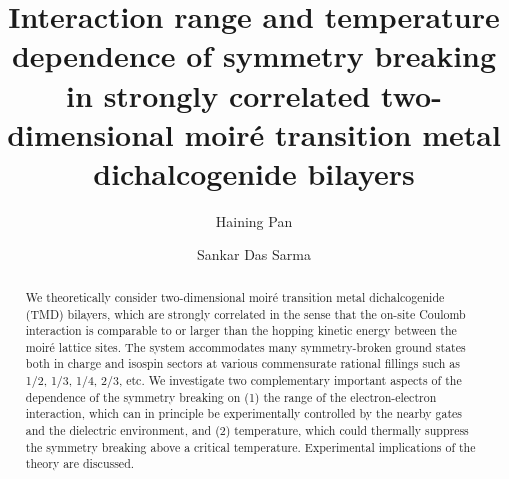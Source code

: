 \documentclass[aps,prb,twocolumn,superscriptaddress,longbibliography]{revtex4-2}
\begin{document}
\title{Interaction range and temperature dependence of symmetry breaking in strongly correlated two-dimensional moir\'e transition metal dichalcogenide bilayers}
\author{Haining Pan}
\author{Sankar Das Sarma}

\begin{abstract}
    We theoretically consider two-dimensional moir\'e transition metal dichalcogenide (TMD) bilayers, which are strongly correlated in the sense that the on-site Coulomb interaction is comparable to or larger than the hopping kinetic energy between the moir\'e lattice sites.  The system accommodates many symmetry-broken ground states both in charge and isospin sectors at various commensurate rational fillings such as 1/2,  1/3, 1/4, 2/3, etc. We investigate two complementary important aspects of the dependence of the symmetry breaking on (1) the range of the electron-electron interaction, which can in principle be experimentally controlled by the nearby gates and the dielectric environment, and (2) temperature, which could thermally suppress the symmetry breaking above a critical temperature.  Experimental implications of the theory are discussed.
\end{abstract}
\end{document}

